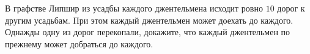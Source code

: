 В графстве Липшир из усадбы каждого джентельмена исходит ровно $10$ дорог к другим усадьбам. При этом
каждый джентельмен может доехать до каждого. Однажды одну из дорог перекопали, докажите, что каждый
джентельмен по прежнему может добраться до каждого. 